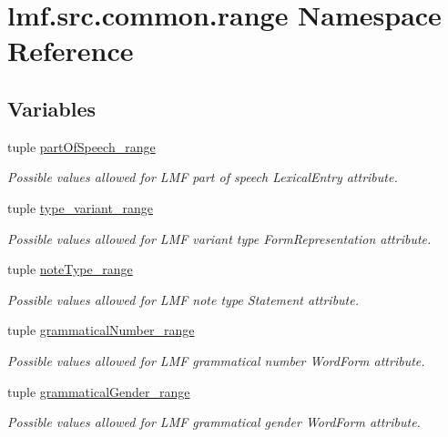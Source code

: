 \hypertarget{namespacelmf_1_1src_1_1common_1_1range}{\section{lmf.\+src.\+common.\+range Namespace Reference}
\label{namespacelmf_1_1src_1_1common_1_1range}
}
\subsection*{Variables}
\begin{DoxyCompactItemize}
\item 
tuple \hyperlink{namespacelmf_1_1src_1_1common_1_1range_a06c6dcbacac56dba9aaf04fa02b528e1}{part\+Of\+Speech\+\_\+range}
\begin{DoxyCompactList}\small\item\em Possible values allowed for L\+M\+F part of speech Lexical\+Entry attribute. \end{DoxyCompactList}\item 
tuple \hyperlink{namespacelmf_1_1src_1_1common_1_1range_a58f5cff733c3b357e42d3ce87c7080a0}{type\+\_\+variant\+\_\+range}
\begin{DoxyCompactList}\small\item\em Possible values allowed for L\+M\+F variant type Form\+Representation attribute. \end{DoxyCompactList}\item 
tuple \hyperlink{namespacelmf_1_1src_1_1common_1_1range_a042b6a6bbc9e29deed31854fb1767b88}{note\+Type\+\_\+range}
\begin{DoxyCompactList}\small\item\em Possible values allowed for L\+M\+F note type Statement attribute. \end{DoxyCompactList}\item 
tuple \hyperlink{namespacelmf_1_1src_1_1common_1_1range_ae3353d03f04380d7379bd193af24a1ad}{grammatical\+Number\+\_\+range}
\begin{DoxyCompactList}\small\item\em Possible values allowed for L\+M\+F grammatical number Word\+Form attribute. \end{DoxyCompactList}\item 
tuple \hyperlink{namespacelmf_1_1src_1_1common_1_1range_ad872b4a301271d86df2980b34e15ffc4}{grammatical\+Gender\+\_\+range}
\begin{DoxyCompactList}\small\item\em Possible values allowed for L\+M\+F grammatical gender Word\+Form attribute. \end{DoxyCompactList}\item 

\end{DoxyCompactItemize}
